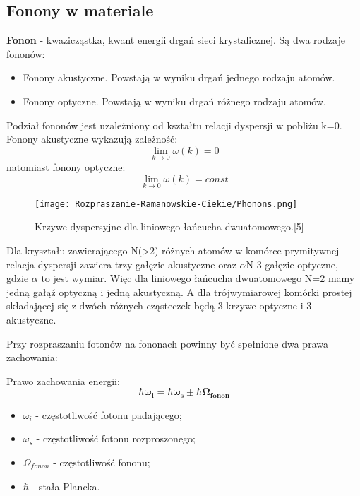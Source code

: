 \newpage

\subsection{Fonony w materiale}
\textbf{Fonon} -  kwazicząstka, kwant energii drgań sieci krystalicznej. Są dwa rodzaje fononów:
\begin{itemize}
	\item{Fonony akustyczne. Powstają w wyniku drgań jednego rodzaju atomów.}
	\item{Fonony optyczne. Powstają w wyniku drgań różnego rodzaju atomów.}
\end{itemize}
Podział fononów jest uzależniony od kształtu relacji dyspersji w pobliżu k=0. \\
Fonony akustyczne wykazują zależność:
\begin{equation}
	\lim_{k \to 0} \omega(k) = 0
\end{equation}
natomiast fonony optyczne:
\begin{equation}
\lim_{k \to 0} \omega(k) = const
\end{equation}
\begin{figure}[H]
	\begin{center}
		\texttt{[image: Rozpraszanie-Ramanowskie-Ciekie/Phonons.png]}
		\caption{Krzywe dyspersyjne dla liniowego łańcucha dwuatomowego.[5]}
	\end{center}
\end{figure}
Dla kryształu zawierającego N(>2) różnych atomów w komórce prymitywnej relacja dyspersji zawiera trzy gałęzie akustyczne oraz $\alpha$N-3 gałęzie optyczne, gdzie $\alpha$ to jest wymiar. Więc dla liniowego łańcucha dwuatomowego N=2 mamy jedną gałąź optyczną i jedną akustyczną. A dla trójwymiarowej komórki prostej składającej się z dwóch różnych cząsteczek będą 3 krzywe optyczne i 3 akustyczne.

Przy rozpraszaniu fotonów na fononach powinny być spełnione dwa prawa zachowania: 

Prawo zachowania energii:
\begin{equation}
	\hbar \mathbf{\omega_{i}} = \hbar \mathbf{\omega_{s}} \pm \hbar \mathbf{\Omega_{fonon}}
\end{equation}
\begin{itemize}
	\item $\omega_{i}$ - częstotliwość fotonu padającego;
	\item $\omega_{s}$ - częstotliwość fotonu rozproszonego;
	\item $\Omega_{fonon}$ - częstotliwość fononu;
	\item $\hbar$ - stała Plancka.
\end{itemize}

